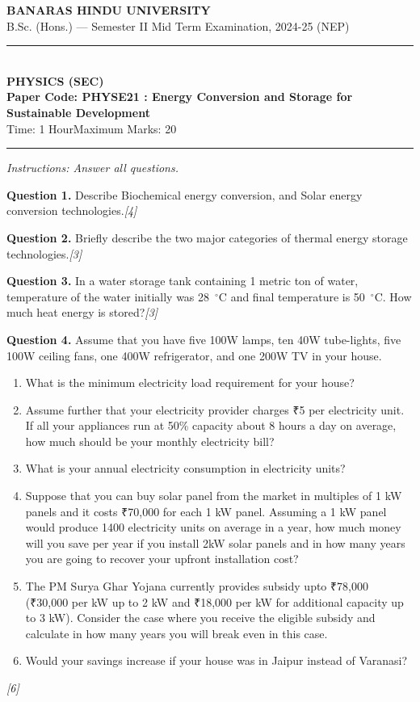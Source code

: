 \documentclass[11pt,a4paper]{article}
\newcommand{\pts}[1]{\hfill \textit{[#1]}}
\begin{document}
\begin{center}
  {\large\bfseries BANARAS HINDU UNIVERSITY}\\[2pt]
  {\normalsize B.Sc. (Hons.) --- Semester II Mid Term Examination, 2024-25 (NEP)}\\[6pt]
  \rule{0.8\linewidth}{0.5pt}\\[6pt]
  {\large\bfseries PHYSICS (SEC)}\\[4pt]
  {\large\bfseries Paper Code: PHYSE21 : Energy Conversion and Storage for Sustainable Development}\\[4pt]
  {\normalsize Time: 1 Hour\hfill Maximum Marks: 20}
\end{center}

\rule{\linewidth}{0.4pt}

\smallskip

\noindent \textit{Instructions: Answer all questions.}

\bigskip

\noindent \textbf{Question 1.} Describe Biochemical energy conversion, and Solar energy conversion technologies.\pts{4}

\medskip

\noindent \textbf{Question 2.} Briefly describe the two major categories of thermal energy storage technologies.\pts{3}

\medskip

\noindent \textbf{Question 3.} In a water storage tank containing 1 metric ton of water, temperature of the water initially was 28~$^\circ$C and final temperature is 50~$^\circ$C. How much heat energy is stored?\pts{3}

\medskip

\noindent \textbf{Question 4.} Assume that you have five 100W lamps, ten 40W tube-lights, five 100W ceiling fans, one 400W refrigerator, and one 200W TV in your house.
\begin{enumerate}[label=(\alph*)]
  \item What is the minimum electricity load requirement for your house?
  \item Assume further that your electricity provider charges ₹5 per electricity unit. If all your appliances run at 50\% capacity about 8 hours a day on average, how much should be your monthly electricity bill?
  \item What is your annual electricity consumption in electricity units?
  \item Suppose that you can buy solar panel from the market in multiples of 1 kW panels and it costs ₹70,000 for each 1 kW panel. Assuming a 1 kW panel would produce 1400 electricity units on average in a year, how much money will you save per year if you install 2kW solar panels and in how many years you are going to recover your upfront installation cost?
  \item The PM Surya Ghar Yojana currently provides subsidy upto ₹78,000 (₹30,000 per kW up to 2 kW and ₹18,000 per kW for additional capacity up to 3 kW). Consider the case where you receive the eligible subsidy and calculate in how many years you will break even in this case.
  \item Would your savings increase if your house was in Jaipur instead of Varanasi?
\end{enumerate}\pts{6}
\end{document}
